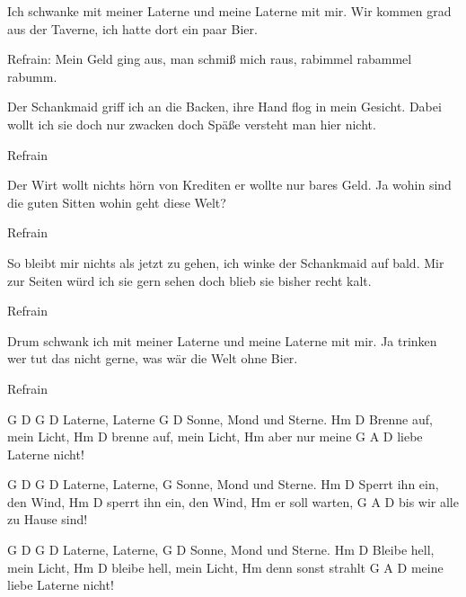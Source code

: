 Ich schwanke mit meiner Laterne und meine Laterne mit mir.
Wir kommen grad aus der Taverne, ich hatte dort ein paar Bier.

Refrain:
Mein Geld ging aus, man schmiß mich raus, rabimmel rabammel rabumm.

Der Schankmaid griff ich an die Backen, ihre Hand flog in mein Gesicht.
Dabei wollt ich sie doch nur zwacken doch Späße versteht man hier nicht.

Refrain

Der Wirt wollt nichts hörn von Krediten er wollte nur bares Geld.
Ja wohin sind die guten Sitten wohin geht diese Welt?

Refrain

So bleibt mir nichts als jetzt zu gehen, ich winke der Schankmaid auf bald.
Mir zur Seiten würd ich sie gern sehen doch blieb sie bisher recht kalt.

Refrain

Drum schwank ich mit meiner Laterne und meine Laterne mit mir.
Ja trinken wer tut das nicht gerne, was wär die Welt ohne Bier.

Refrain


G   D     G   D
Laterne, Laterne
            G       D
Sonne, Mond und Sterne.
           Hm     D
Brenne auf, mein Licht,
           Hm     D
brenne auf, mein Licht,
        Hm
aber nur meine
G           A       D
liebe Laterne nicht!


G   D     G   D
Laterne, Laterne,
        G
Sonne, Mond und Sterne.
          Hm       D
Sperrt ihn ein, den Wind,
          Hm         D
sperrt ihn ein, den Wind,
         Hm
er soll warten,
G           A       D
bis wir alle zu Hause sind!


 G   D     G   D
Laterne, Laterne,
        G        D
Sonne, Mond und Sterne.
         Hm        D
Bleibe hell, mein Licht,
         Hm       D
bleibe hell, mein Licht,
        Hm
denn sonst strahlt
G           A       D
meine liebe Laterne nicht!
